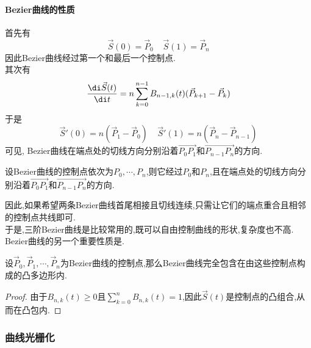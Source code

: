 \documentclass{ctexart}
\begin{document}
\paragraph{Bezier曲线的性质}
首先有
\[\vec{S}(0)=\vec{P}_0\ \ \ \ \ \vec{S}(1)=\vec{P}_n\]
因此Bezier曲线经过第一个和最后一个控制点.\\
\indent 其次有
\[\dfrac{\di\vec{S}(t)}{\di t}=n\sum_{
k=0}^{n-1}B_{n-1,k}(t)(\vec{P}_{k+1}-\vec{P}_k
)\]
于是
\[\vec{S}'(0)=n\left(\vec{P}_1-\vec{P}_0\right)\ \ \ \ \ \vec{S}'(1)=n\left(\vec{P}_n-\vec{P}_{n-1}\right)\]
可见, Bezier曲线在端点处的切线方向分别沿着$\overrightarrow{P_0P_1}$和$\overrightarrow{P_{n-1}P_n}$的方向.
\begin{theorem}[Bezier曲线与端点的关系]
    设Bezier曲线的控制点依次为$P_0,\cdots,P_n$,则它经过$P_0$和$P_n$,且在端点处的切线方向分别沿着$\overrightarrow{P_0P_1}$和$\overrightarrow{P_{n-1}P_n}$的方向.
\end{theorem}
因此,如果希望两条Bezier曲线首尾相接且切线连续,只需让它们的端点重合且相邻的控制点共线即可.\\
\indent 于是,三阶Bezier曲线是比较常用的,既可以自由控制曲线的形状,复杂度也不高.\\
\indent Bezier曲线的另一个重要性质是.
\begin{definition}[凸包性质]
    设$\vec{P}_0,\vec{P}_1,\cdots,\vec{P}_n$为Bezier曲线的控制点,那么Bezier曲线完全包含在由这些控制点构成的凸多边形内.
\end{definition}
\begin{proof}
    由于$B_{n,k}(t)\geqslant 0$且$\displaystyle\sum_{k=0}^nB_{n,k}(t)=1$,因此$\vec{S}(t)$是控制点的凸组合,从而在凸包内.
\end{proof}
\subsubsection{曲线光栅化}
\end{document}
